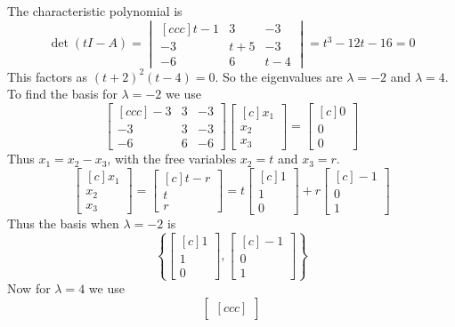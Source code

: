 \begin{solution}
The characteristic polynomial is
$$
\det(t I - A) =
\begin{vmatrix}[ccc]
t-1&3&-3\\
-3&t + 5&-3\\
-6&6&t-4
\end{vmatrix}
=
t^3-12t - 16 = 0
$$
This factors as $(t+2)^2(t - 4)=0$. So the eigenvalues are $\lambda =-2$ and $\lambda = 4$. To find the basis for $\lambda = -2$ we use
$$
\begin{bmatrix}[ccc]
-3&3&-3\\
-3&3&-3\\
-6&6&-6
\end{bmatrix}
\begin{bmatrix}[c]
x_1\\
x_2\\
x_3
\end{bmatrix}
=
\begin{bmatrix}[c]
0\\
0\\
0
\end{bmatrix}
$$
Thus $x_1 = x_2-x_3$, with the free variables $x_2=t$ and $x_3=r$.
$$
\begin{bmatrix}[c]
x_1\\
x_2\\
x_3
\end{bmatrix}
=
\begin{bmatrix}[c]
t-r\\
t\\
r
\end{bmatrix}
=
t
\begin{bmatrix}[c]
1\\
1\\
0
\end{bmatrix} +r
\begin{bmatrix}[c]
-1\\
0\\
1
\end{bmatrix}
$$
Thus the basis when $\lambda = -2$ is
$$
\left\{
\begin{bmatrix}[c]
1\\
1\\
0
\end{bmatrix},
\begin{bmatrix}[c]
-1\\
0\\
1
\end{bmatrix}
\right\}
$$
Now for $\lambda = 4$ we use
$$
\begin{bmatrix}[ccc]

\end{bmatrix}$$
\end{solution}
